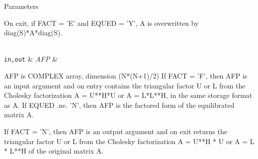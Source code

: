 \begin{DoxyParams}[1]{Parameters}
\begin{DoxyVerb}
          On exit, if FACT = 'E' and EQUED = 'Y', A is overwritten by
          diag(S)*A*diag(S).\end{DoxyVerb}
\\
\hline
\mbox{\tt in,out}  & {\em A\+F\+P} & \begin{DoxyVerb}          AFP is COMPLEX array, dimension (N*(N+1)/2)
          If FACT = 'F', then AFP is an input argument and on entry
          contains the triangular factor U or L from the Cholesky
          factorization A = U**H*U or A = L*L**H, in the same storage
          format as A.  If EQUED .ne. 'N', then AFP is the factored
          form of the equilibrated matrix A.

          If FACT = 'N', then AFP is an output argument and on exit
          returns the triangular factor U or L from the Cholesky
          factorization A = U**H * U or A = L * L**H of the original
          matrix A.


\end{DoxyVerb}
\end{DoxyParams}
